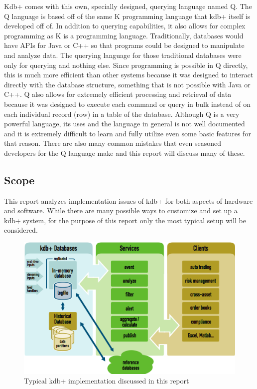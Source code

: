 Kdb+ comes with this own, specially designed, querying language named Q. The Q language is based off of the same K programming language that kdb+ itself is developed off of.  In addition to querying capabilities, it also allows for complex programming as K is a programming language.  Traditionally, databases would have APIs for Java or C++ so that programs could be designed to manipulate and analyze data.  The querying language for those traditional databases were only for querying and nothing else.  Since programming is possible in Q directly, this is much more efficient than other systems because it was designed to interact directly with the database structure, something that is not possible with Java or C++.  Q also allows for extremely efficient processing and retrieval of data because it was designed to execute each command or query in bulk instead of on each individual record (row) in a table of the database.  Although Q is a very powerful language, its uses and the language in general is not well documented and it is extremely difficult to learn and fully utilize even some basic features for that reason.  There are also many common mistakes that even seasoned developers for the Q language make and this report will discuss many of these.\\

	\subsection{Scope} %
	\label{sub:scope}
This report analyzes implementation issues of kdb+ for both aspects of hardware and software. While there are many possible ways to customize and set up a kdb+ system, for the purpose of this report only the most typical setup will be considered.\\ 
\begin{figure}[htp]
	\centering
	\subfigure{}
	\includegraphics[width=.80\textwidth]{images/conceptual}
	\caption[kdb+ Diagram]{Typical kdb+ implementation discussed in this report\cite{whitepaper}}
	\label{fig:typical kdb+ system}
\end{figure}\\

